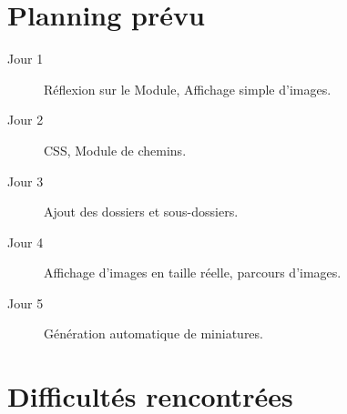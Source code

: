 \documentclass{life-fr}
\begin{document}
\section{Planning prévu}

\begin{description}
  \item[Jour 1] Réflexion sur le Module, Affichage simple d'images.
  \item[Jour 2] CSS, Module de chemins.
  \item[Jour 3] Ajout des dossiers et sous-dossiers.
  \item[Jour 4] Affichage d'images en taille réelle, parcours d'images.
  \item[Jour 5] Génération automatique de miniatures.
\end{description}

\section{Difficultés rencontrées}
\end{document}
